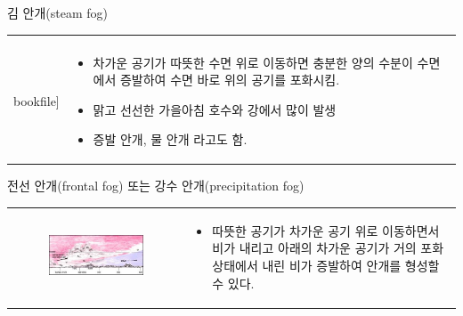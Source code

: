 \begin{frame}[t]{김 안개(steam fog)}
	\begin{tabular}{ll}
		\begin{minipage}[t]{0.5\textwidth}\scriptsize
			\begin{figure}[t]
				\texttt{[image: \\bookfile]}
			\end{figure}
		\end{minipage}	
		&
		\begin{minipage}[t]{0.45\textwidth} \scriptsize
			\begin{itemize}
				\item 차가운 공기가 따뜻한 수면 위로 이동하면 충분한 양의 수분이 수면에서 증발하여 수면 바로 위의 공기를 포화시킴.
				\item 맑고 선선한 가을아침 호수와 강에서 많이 발생
				\item 증발 안개, 물 안개 라고도 함.				
			\end{itemize}		
		\end{minipage}
	\end{tabular}
\end{frame}




\begin{frame}[t]{전선 안개(frontal fog) 또는 강수 안개(precipitation fog)}
	\begin{tabular}{ll}
		\begin{minipage}[t]{0.45\textwidth} \scriptsize
			\begin{figure}[t]
				\includegraphics[width=\textwidth]{./images/frontal_fog}
			\end{figure}
		\end{minipage}	
		&
		\begin{minipage}[t]{0.5\textwidth} \scriptsize
			\begin{itemize}
				\item 따뜻한 공기가 차가운 공기 위로 이동하면서 비가 내리고 아래의 차가운 공기가 거의 포화상태에서 내린 비가 증발하여 안개를 형성할 수 있다. 
			\end{itemize}		
		\end{minipage}
	\end{tabular}
\end{frame}


